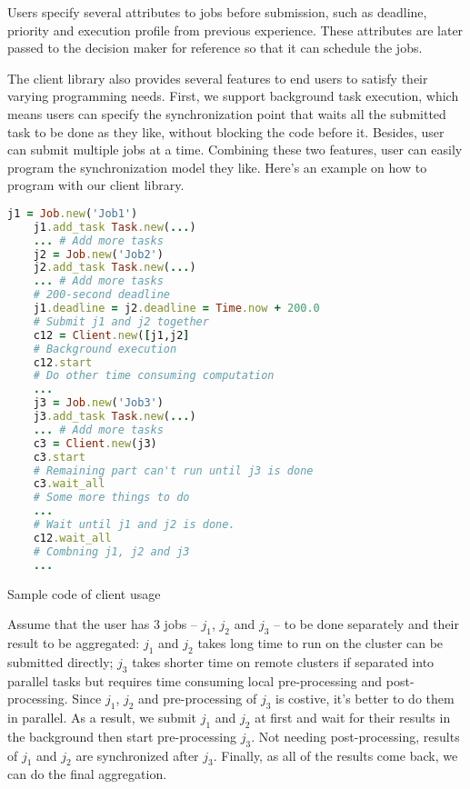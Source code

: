Users specify several attributes to jobs before submission, such as
deadline, priority and execution profile from previous experience.
These attributes are later passed to the decision maker for reference so
that it can schedule the jobs.

The client library also provides several features to end users to
satisfy their varying programming needs.
First, we support background task execution, which means users can
specify the synchronization point that waits all the submitted task to
be done as they like, without blocking the code before it.
Besides, user can submit multiple jobs at a time.
Combining these two features, user can easily program the
synchronization model they like.
Here's an example on how to program with our client library.

\begin{Example Code}

  \begin{spacing}{1.0}
    \begin{lstlisting}[language=Ruby]
    j1 = Job.new('Job1')
    j1.add_task Task.new(...)
    ... # Add more tasks
    j2 = Job.new('Job2')
    j2.add_task Task.new(...)
    ... # Add more tasks
    # 200-second deadline
    j1.deadline = j2.deadline = Time.now + 200.0
    # Submit j1 and j2 together
    c12 = Client.new([j1,j2]
    # Background execution
    c12.start
    # Do other time consuming computation
    ...
    j3 = Job.new('Job3')
    j3.add_task Task.new(...)
    ... # Add more tasks
    c3 = Client.new(j3)
    c3.start
    # Remaining part can't run until j3 is done
    c3.wait_all
    # Some more things to do
    ...
    # Wait until j1 and j2 is done.
    c12.wait_all
    # Combning j1, j2 and j3
    ...

    \end{lstlisting}
  \end{spacing}
  \caption{Sample code of client usage}
\end{Example Code}

Assume that the user has 3 jobs -- $j_1$, $j_2$ and $j_3$ -- to be done
separately and their result to be aggregated:  $j_1$ and $j_2$ takes
long time to run on the cluster can be submitted directly; $j_3$ takes
shorter time on remote clusters if separated into parallel tasks but
requires time consuming local pre-processing and post-processing.
Since $j_1$, $j_2$ and pre-processing of $j_3$ is costive, it's better
to do them in parallel.
As a result, we submit $j_1$ and $j_2$ at first and wait for their
results in the background then start pre-processing $j_3$. Not needing
post-processing, results of $j_1$ and $j_2$ are synchronized after
$j_3$.
Finally, as all of the results come back, we can do the final
aggregation.

